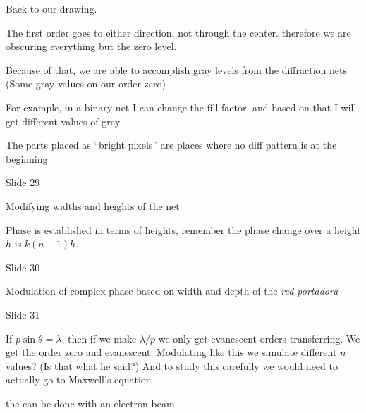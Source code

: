 \documentclass[../main/main.tex]{subfiles}
\begin{document}
Back to our drawing.

The first order goes to either direction, not through the center. therefore we are obscuring everything but the zero level.

Because of that, we are able to accomplish gray levels from the diffraction nets (Some gray values on our order zero)

For example, in a binary net I can change the fill factor, and based on that I will get different values of grey.

The parts placed as ``bright pixels'' are places where no diff pattern is at the beginning

Slide 29

Modifying widths and heights of the net

Phase is established in terms of heights, remember the phase change over a height $h$ is $k (n-1)h$.

Slide 30

Modulation of complex phase based on width and depth of the \emph{red portadora}


Slide 31

If $p \sin \theta = \lambda$, then if we make $\lambda/p$ we only get evanescent orders transferring. We get the order zero and evanescent. Modulating like this we simulate different $n$ values? (Is that what he said?) And to study this carefully we would need to actually go to Maxwell's equation

the can be done with an electron beam.
\end{document}
